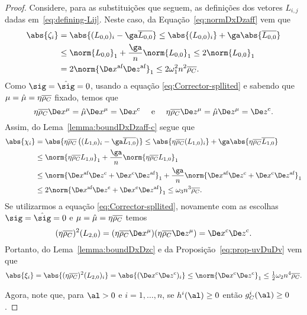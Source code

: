 \begin{proof}
Considere, para as substituições que seguem, as definições dos vetores $L_{i,j}$ dadas em~\eqref{eq:defining-Lij}. Neste caso, da Equação~\eqref{eq:normDxDzaff}  vem que  
\begin{align}
\abs{\zeta_i} & = \abs{(L_{0,0})_i - \ga \dbvec{L_{0,0}}} \leq \abs{(L_{0,0})_i} + \ga \abs{\dbvec{L_{0,0}}} \notag \\
			  & \leq	\norm{L_{0,0}}_1  + \dfrac{\ga}{n}\norm{L_{0,0}}_1   \leq 2\norm{L_{0,0}}_1 \notag \\
			  & = 2\norm{\dex\dez}_1   \leq 2\omega_1^{2} n^{2}\dbvec{\rho_C}. \label{eq:bound-zeta-i}
\end{align}
Como $\sig = \nextsig=0$, usando a equação \eqref{eq:Corrector-spllited} e sabendo que $\mu=\hat{\mu} = \eta\overline{\rho_{C}}$ fixado, temos que 
	\[
		\eta\dbvec{\rho_{C}}\Dex^\mu =  \nextmu\Dex^\mu = \Decox   \quad \text{ e } \quad \eta\dbvec{\rho_{C}}\Dez^\mu=  \nextmu\Dez^\mu=  \Decoz .
	\]
	Assim, do Lema~\ref{lemma:boundDxDzaff-c} segue que
\begin{align}
	\abs{\chi_i }  	& = \abs{\eta\dbvec{\rho_C} \left( ({L_{1,0}})_i - \ga\dbvec{L_{1,0}} \right)} \leq \abs{\eta\dbvec{\rho_C}  ({L_{1,0}})_i} + \ga\abs { \eta\dbvec{\rho_C}\dbvec{L_{1,0}}} 
					\notag \\
					&\leq \norm{\eta\dbvec{\rho_C}  L_{1,0}}_1 + \dfrac{\ga}{n}\norm{\eta\dbvec{\rho_C}  L_{1,0}}_1 \notag\\
					& \leq \norm{\dex\Decoz + \Decox\dez}_1 + \dfrac{\ga}{n}\norm{\dex\Decoz + \Decox\dez}_1 \notag\\
					& \leq 2 \norm{\dex\Decoz + \Decox\dez}_1  \leq \omega_{3}n^{3}\dbvec{\rho_C}. \label{eq:bound-chi-i}
\end{align}
Se utilizarmos  a equação \eqref{eq:Corrector-spllited}, novamente com as escolhas $\sig = \nextsig=0$ e $\mu=\hat{\mu} = \eta\overline{\rho_{C}}$ temos
\[
	(\eta\dbvec{\rho_C})^2(L_{2,0}) = (\eta\dbvec{\rho_C}\Dex^\mu)(\eta\dbvec{\rho_C}\Dez^\mu) = \Decox\Decoz.
\]
Portanto, do Lema~\ref{lemma:boundDxDzc} e da Proposição~\ref{eq:prop-uvDuDv} vem que
\begin{equation}\label{eq:bound-xi-i}
	\abs{\xi_i}	 =  \abs{(\eta\dbvec{\rho_C})^2(L_{2,0})_i}  = \abs{(\Decox\Decoz)_i} \leq \norm{\Decox\Decoz}_1 \leq \tfrac{1}{2} \omega_2 n^{4}\dbvec{\rho_C}.
\end{equation}
	


Agora, note que, para $\al>0$ e $i=1,\ldots,n$, se $h^i(\al)\geq0$ então $g_C^i(\al)\geq 0$. 


\end{proof}
